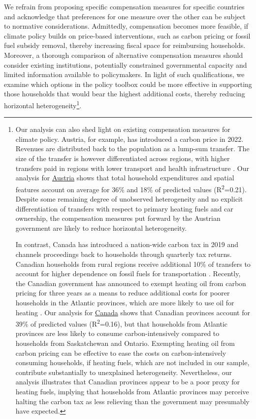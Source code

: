 \documentclass[12pt, a4paper]{article}
\begin{document}
We refrain from proposing specific compensation measures for specific countries and acknowledge that preferences for one measure over the other can be subject to normative considerations. Admittedly, compensation becomes more feasible, if climate policy builds on price-based interventions, such as carbon pricing or fossil fuel subsidy removal, thereby increasing fiscal space for reimbursing households. Moreover, a thorough comparison of alternative compensation measures should consider existing institutions, potentially constrained governmental capacity and limited information available to policymakers. In light of such qualifications, we examine which options in the policy toolbox could be more effective in supporting those households that would bear the highest additional costs, thereby reducing horizontal heterogeneity\footnote{Our analysis can also shed light on existing compensation measures for climate policy. Austria, for example, has introduced a carbon price in 2022. Revenues are distributed back to the population as a lump-sum transfer. The size of the transfer is however differentiated across regions, with higher transfers paid in regions with lower transport and health infrastructure \autocite{BMK.2023}. Our analysis for \hyperref[fig:5b_AUT]{Austria} shows that total household expenditures and spatial features account on average for 36\% and 18\% of predicted values (R\textsuperscript{2}=0.21). Despite some remaining degree of unobserved heterogeneity and no explicit differentiation of transfers with respect to primary heating fuels and car ownership, the compensation measures put forward by the Austrian government are likely to reduce horizontal heterogeneity.

In contrast, Canada has introduced a nation-wide carbon tax in 2019 and channels proceedings back to households through quarterly tax returns. Canadian households from rural regions receive additional 10\% of transfers to account for higher dependence on fossil fuels for transportation \autocite{GovernmentofCanada.2023}. Recently, the Canadian government has announced to exempt heating oil from carbon pricing for three years as a means to reduce additional costs for poorer households in the Atlantic provinces, which are more likely to use oil for heating \autocite{Reuters.2023}. Our analysis for \hyperref[fig:5b_CAN]{Canada} shows that Canadian provinces account for 39\% of predicted values (R\textsuperscript{2}=0.16), but that households from Atlantic provinces are less likely to consume carbon-intensively compared to households from Saskatchewan and Ontario. Exempting heating oil from carbon pricing can be effective to ease the costs on carbon-intensively consuming households, if heating fuels, which are not included in our sample, contribute substantially to unexplained heterogeneity. Nevertheless, our analysis illustrates that Canadian provinces appear to be a poor proxy for heating fuels, implying that households from Atlantic provinces may perceive halting the carbon tax as less relieving than the government may presumably have expected.}.
\end{document}
